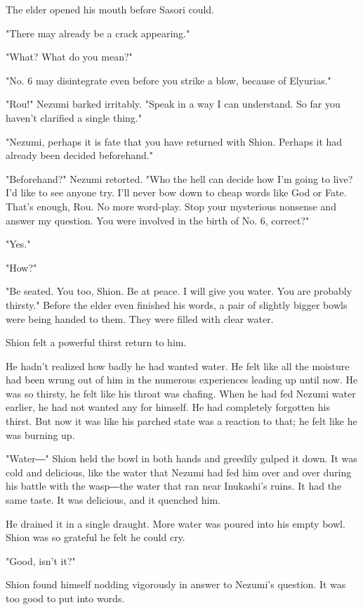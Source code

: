 The elder opened his mouth before Sasori could.

"There may already be a crack appearing."

"What? What do you mean?"

"No. 6 may disintegrate even before you strike a blow, because of
Elyurias."

"Rou!" Nezumi barked irritably. "Speak in a way I can understand. So far
you haven't clarified a single thing."

"Nezumi, perhaps it is fate that you have returned with Shion. Perhaps
it had already been decided beforehand."

"Beforehand?" Nezumi retorted. "Who the hell can decide how I'm going to
live? I'd like to see anyone try. I'll never bow down to cheap words
like God or Fate. That's enough, Rou. No more word-play. Stop your
mysterious nonsense and answer my question. You were involved in the
birth of No. 6, correct?"

"Yes."

"How?"

"Be seated. You too, Shion. Be at peace. I will give you water. You are
probably thirsty." Before the elder even finished his words, a pair of
slightly bigger bowls were being handed to them. They were filled with
clear water.

Shion felt a powerful thirst return to him.

He hadn't realized how badly he had wanted water. He felt like all the
moisture had been wrung out of him in the numerous experiences leading
up until now. He was so thirsty, he felt like his throat was chafing.
When he had fed Nezumi water earlier, he had not wanted any for himself.
He had completely forgotten his thirst. But now it was like his parched
state was a reaction to that; he felt like he was burning up.

"Water―" Shion held the bowl in both hands and greedily gulped it down.
It was cold and delicious, like the water that Nezumi had fed him over
and over during his battle with the wasp―the water that ran near
Inukashi's ruins. It had the same taste. It was delicious, and it
quenched him.

He drained it in a single draught. More water was poured into his empty
bowl. Shion was so grateful he felt he could cry.

"Good, isn't it?"

Shion found himself nodding vigorously in answer to Nezumi's question.
It was too good to put into words.

